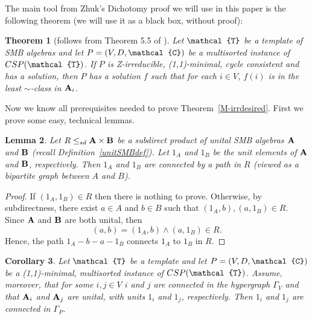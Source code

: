 \documentclass[11pt]{amsart}
\newcommand{\m}[1]{{\uppercase {\mathbf {#1}}}}
\newcommand{\vr}[1]{{\uppercase {\mathcal{#1}}}}
\newcommand{\mt}{\wedge}
\newtheorem{thm}{Theorem}[section]
\newtheorem{lm}[thm]{Lemma}
\newtheorem{cor}[thm]{Corollary}
\theoremstyle{definition}
\begin{document}
The main tool from Zhuk's Dichotomy proof we will use in this paper is the following theorem (we will use it as a black box, without proof):

\begin{thm}[follows from Theorem 5.5 of \cite{Zhdich}]\label{Zhlemma}
Let $\vr t$ be a template of SMB algebras and let $P=(V,D,\vr c)$ be a multisorted instance of $CSP(\vr t)$. If $P$ is Z-irreducible, (1,1)-minimal, cycle consistent and has a solution, then $P$ has a solution $f$ such that for each $i\in V$, $f(i)$ is in the least $\sim$-class in $\m a_i$.
\end{thm}

Now we know all prerequisites needed to prove Theorem~\ref{M-irrdesired}. First we prove some easy, technical lemmas.

\begin{lm}\label{unitsconnected}
Let $R\leq_{sd}\m a\times\m b$ be a subdirect product of unital SMB algebras $\m a$ and $\m b$ (recall Definition~\ref{unitSMBdef}). Let $1_A$ and $1_B$ be the unit elements of $\m a$ and $\m b$, respectively. Then $1_A$ and $1_B$ are connected by a path in $R$ (viewed as a bipartite graph between $A$ and $B$). 
\end{lm}

\begin{proof}
If $(1_A,1_B)\in R$ then there is nothing to prove. Otherwise, by subdirectness, there exist $a\in A$ and $b\in B$ such that $(1_A,b),(a,1_B)\in R$. Since $\m a$ and $\m b$ are both unital, then \[(a,b)=(1_A,b)\mt (a,1_B)\in R.\]
Hence, the path $1_A - b - a - 1_B$ connects $1_A$ to $1_B$ in $R$.
\end{proof}

\begin{cor}\label{unitsconnhyper}
Let $\vr t$ be a template and let $P=(V,D,\vr c)$ be a (1,1)-minimal, multisorted instance of $CSP(\vr t)$. Assume, moreover, that for some $i,j\in V$ $i$ and $j$ are connected in the hypergraph $\Gamma_V$ and that $\m a_i$ and $\m a_j$ are unital, with units $1_i$ and $1_j$, respectively. Then $1_i$ and $1_j$ are connected in $\Gamma_P$.
\end{cor}
\end{document}
